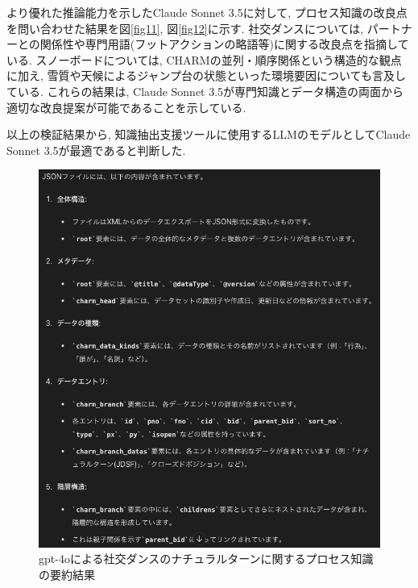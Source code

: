 より優れた推論能力を示したClaude Sonnet 3.5に対して, プロセス知識の改良点を問い合わせた結果を図\ref{fig11}, 図\ref{fig12}に示す. 社交ダンスについては, パートナーとの関係性や専門用語(フットアクションの略語等)に関する改良点を指摘している. スノーボードについては, CHARMの並列・順序関係という構造的な観点に加え, 雪質や天候によるジャンプ台の状態といった環境要因についても言及している. これらの結果は, Claude Sonnet 3.5が専門知識とデータ構造の両面から適切な改良提案が可能であることを示している.

以上の検証結果から, 知識抽出支援ツールに使用するLLMのモデルとしてClaude Sonnet 3.5が最適であると判断した.

\begin{figure}[htbp]
    \centering
    \includegraphics[width=1.0\linewidth]{./image/natural_turn_summarize_gpt4o_2.png}
    \caption{gpt-4oによる社交ダンスのナチュラルターンに関するプロセス知識の要約結果}
    \label{fig7}
\end{figure}

